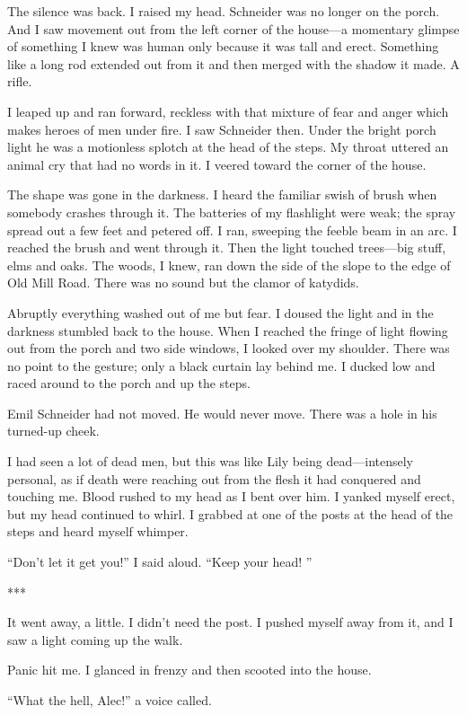 \documentclass{novel}
\begin{document}
The silence was back. I raised my head. Schneider was no longer on the porch. And I saw movement out from the left corner of the house—a momentary glimpse of something I knew was human only because it was tall and erect. Something like a long rod extended out from it and then merged with the shadow it made. A rifle.

I leaped up and ran forward, reckless with that mixture of fear and anger which makes heroes of men under fire. I saw Schneider then. Under the bright porch light he was a motionless splotch at the head of the steps. My throat uttered an animal cry that had no words in it. I veered toward the corner of the house.

The shape was gone in the darkness. I heard the familiar swish of brush when somebody crashes through it. The batteries of my flashlight were weak; the spray spread out a few feet and petered off. I ran, sweeping the feeble beam in an arc. I reached the brush and went through it. Then the light touched trees—big stuff, elms and oaks. The woods, I knew, ran down the side of the slope to the edge of Old Mill Road. There was no sound but the clamor of katydids.

Abruptly everything washed out of me but fear. I doused the light and in the darkness stumbled back to the house. When I reached the fringe of light flowing out from the porch and two side windows, I looked over my shoulder. There was no point to the gesture; only a black curtain lay behind me. I ducked low and raced around to the porch and up the steps.

Emil Schneider had not moved. He would never move. There was a hole in his turned-up cheek.

I had seen a lot of dead men, but this was like Lily being dead—intensely personal, as if death were reaching out from the flesh it had conquered and touching me. Blood rushed to my head as I bent over him. I yanked myself erect, but my head continued to whirl. I grabbed at one of the posts at the head of the steps and heard myself whimper.

“Don’t let it get you!” I said aloud. “Keep your head! ”

***

It went away, a little. I didn’t need the post. I pushed myself away from it, and I saw a light coming up the walk.

Panic hit me. I glanced in frenzy and then scooted into the house.

“What the hell, Alec!” a voice called.
\end{document}
